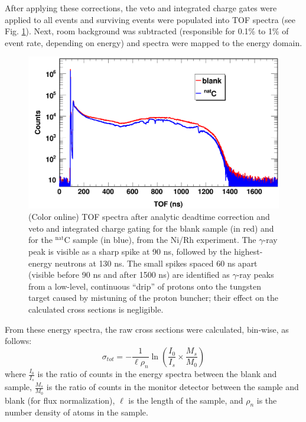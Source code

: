 \documentclass[twocolumn,secnumarabic,amssymb, nobibnotes, aps, prl,
superscriptaddress, nobalancelastpage]{revtex4}
\newcommand{\tot}{\ensuremath{\sigma_{tot}}}
\begin{document}
After applying these corrections, the veto and integrated charge gates were applied to 
all events and surviving events were populated into TOF spectra (see Fig.
\ref{ExampleTOFSpectrum}). Next, room background was subtracted (responsible for 0.1\% to 
1\% of event rate, depending on energy) and spectra were mapped to the energy domain.
\begin{figure}
    \includegraphics[width=\linewidth]{figures/exampleTOFSpectrum.png}
    \caption{(Color online) TOF spectra after analytic deadtime correction and
        veto and integrated charge gating for the blank sample (in
        red) and for the $^{\text{nat}}$C sample (in blue), from the Ni/Rh experiment.
        The $\gamma$-ray peak is visible as a sharp spike at 90 ns, followed by
        the highest-energy neutrons at 130 ns. The small spikes spaced 60 ns
        apart (visible before 90 ns and after 1500
        ns) are identified as $\gamma$-ray peaks from a low-level, continuous
        ``drip'' 
        of protons onto the tungsten target caused by mistuning of the proton 
        buncher; their effect on the calculated cross sections is negligible.
    }
    \label{ExampleTOFSpectrum}
\end{figure}

From these energy spectra, the raw cross sections were calculated, bin-wise, as follows:
$$
\tot = -\frac{1}{\ell\rho_{n}}
\ln \left(\frac{I_{0}}{I_{s}}\times\frac{M_{s}}{M_{0}}\right)
$$
where $\frac{I_{0}}{I_{s}}$ is the ratio of counts in the energy spectra between 
the blank and sample, $\frac{M_{s}}{M_{0}}$ is the ratio of counts in the
monitor detector between the sample and blank (for flux normalization), $\ell$ is the length 
of the sample, and $\rho_{n}$ is the number density of atoms in the sample.
\end{document}
